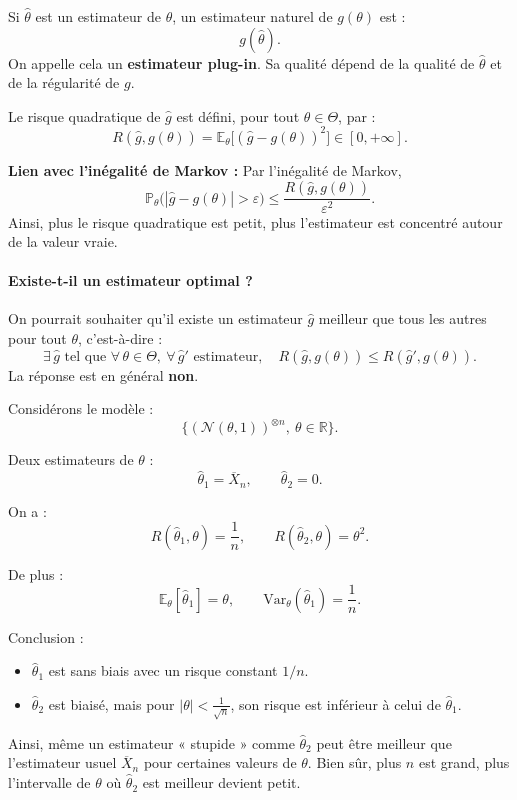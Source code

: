 \begin{notation}
Si $\hat{\theta}$ est un estimateur de $\theta$, un estimateur naturel de $g(\theta)$ est :
\[
g(\hat{\theta}).
\]
On appelle cela un \textbf{estimateur plug-in}.  
Sa qualité dépend de la qualité de $\hat{\theta}$ et de la régularité de $g$.
\end{notation}

\begin{definition}
Le risque quadratique de $\hat{g}$ est défini, pour tout $\theta \in \Theta$, par :
\[
R(\hat{g}, g(\theta)) = \mathbb{E}_\theta \big[ (\hat{g} - g(\theta))^2 \big] \in [0, +\infty].
\]
\end{definition}

\begin{remarque}
\textbf{Lien avec l'inégalité de Markov :}
Par l'inégalité de Markov,
\[
\mathbb{P}_\theta \big( |\hat{g} - g(\theta)| > \varepsilon \big) \leq \frac{R(\hat{g}, g(\theta))}{\varepsilon^2}.
\]
Ainsi, plus le risque quadratique est petit, plus l'estimateur est concentré autour de la valeur vraie.
\end{remarque}

\paragraph{Existe-t-il un estimateur optimal ?}

On pourrait souhaiter qu'il existe un estimateur $\hat{g}$ meilleur que tous les autres pour tout $\theta$, c'est-à-dire :
\[
\exists\, \hat{g} \text{ tel que } \forall\, \theta \in \Theta,\ \forall\, \hat{g}' \text{ estimateur},\quad R(\hat{g}, g(\theta)) \leq R(\hat{g}', g(\theta)).
\]
La réponse est en général \textbf{non}.

\begin{exemple}
Considérons le modèle :
\[
\{ (\mathcal{N}(\theta,1))^{\otimes n}, \ \theta \in \mathbb{R} \}.
\]

Deux estimateurs de $\theta$ :
\[
\hat{\theta}_1 = \overline{X}_n, \qquad \hat{\theta}_2 = 0.
\]

On a :
\[
R(\hat{\theta}_1, \theta) = \frac{1}{n}, \qquad R(\hat{\theta}_2, \theta) = \theta^2.
\]

De plus :
\[
\mathbb{E}_\theta[\hat{\theta}_1] = \theta, \qquad \mathrm{Var}_\theta(\hat{\theta}_1) = \frac{1}{n}.
\]

Conclusion :
\begin{itemize}
  \item $\hat{\theta}_1$ est sans biais avec un risque constant $1/n$.
  \item $\hat{\theta}_2$ est biaisé, mais pour $|\theta| < \frac{1}{\sqrt{n}}$, son risque est inférieur à celui de $\hat{\theta}_1$.
\end{itemize}

Ainsi, même un estimateur « stupide » comme $\hat{\theta}_2$ peut être meilleur que l'estimateur usuel $\overline{X}_n$ pour certaines valeurs de $\theta$. Bien sûr, plus $n$ est grand, plus l'intervalle de $\theta$ où $\hat{\theta}_2$ est meilleur devient petit.
\end{exemple}

